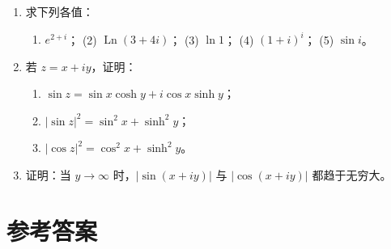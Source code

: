 \begin{enumerate}
  \begin{enumerate}
  \def\labelenumii{(\arabic{enumii})}
  \tightlist
  \item
    若 \(f(z)\) 在 \(z_0\) 连续，则 \(f'(z_0)\) 存在；
  \item
    若 \(f'(z_0)\) 存在，则 \(f(z)\) 在 \(z_0\) 解析；
  \item
    若 \(z_0\) 是 \(f(z)\) 的奇点，则 \(f(z)\) 在 \(z_0\) 不可导；
  \item
    若 \(z_0\) 是 \(f(z)\) 和 \(g(z)\) 的奇点，则 \(z_0\) 也是
    \(f(z)+g(z)\) 的奇点；
  \item
    若 \(u(x,y),v(x,y)\) 的偏导数存在，则 \(f(z)=u+iv\) 可导；
  \item
    若 \(f(z)=u+iv\) 在区域 \(D\) 内解析，且 \(u\) 为实常数，则 \(f(z)\)
    在 \(D\) 内为常数（\(v\) 为实常数时同理）。
  \end{enumerate}
\item
  求下列各值：

  \begin{enumerate}
  \def\labelenumii{(\arabic{enumii})}
  \tightlist
  \item
    \(e^{2+i}\)； (2) \(\operatorname{Ln}(3+4i)\)； (3) \(\ln 1\)； (4)
    \((1+i)^i\)； (5) \(\sin i\)。
  \end{enumerate}
\item
  若 \(z=x+iy\)，证明：

  \begin{enumerate}
  \def\labelenumii{(\arabic{enumii})}
  \tightlist
  \item
    \(\sin z=\sin x\cosh y+i\cos x\sinh y\)；
  \item
    \(|\sin z|^2=\sin^2 x+\sinh^2 y\)；
  \item
    \(|\cos z|^2=\cos^2 x+\sinh^2 y\)。
  \end{enumerate}
\item
  证明：当 \(y\to\infty\) 时，\(|\sin(x+iy)|\) 与 \(|\cos(x+iy)|\)
  都趋于无穷大。
\end{enumerate}

\section{参考答案}\label{ux53c2ux8003ux7b54ux6848-1}

